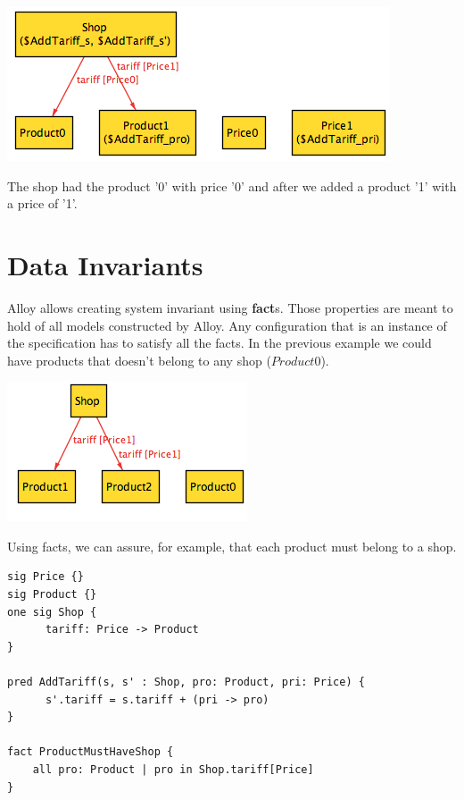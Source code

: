 \documentclass[oneside]{book}
\begin{document}
\begin{center}
\includegraphics[scale=0.6]{shop3}
\end{center}

The shop had the product '0' with price '0' and after we added a product '1' with a price of '1'.

\newpage

\section{Data Invariants}

Alloy allows creating system invariant using \textbf{fact}s. Those properties are meant to hold of all models constructed by Alloy. Any configuration that is an instance of the specification has to satisfy all the facts. In the previous example we could have products that doesn't belong to any shop ($Product0$).

\begin{center}
\includegraphics[scale=0.6]{shop4}
\end{center}

Using facts, we can assure, for example, that each product must belong to a shop.

\begin{lstlisting}
sig Price {}
sig Product {}
one sig Shop {
	  tariff: Price -> Product
}

pred AddTariff(s, s' : Shop, pro: Product, pri: Price) {
	  s'.tariff = s.tariff + (pri -> pro)
}

fact ProductMustHaveShop {
	all pro: Product | pro in Shop.tariff[Price]
}
\end{lstlisting}
\end{document}
